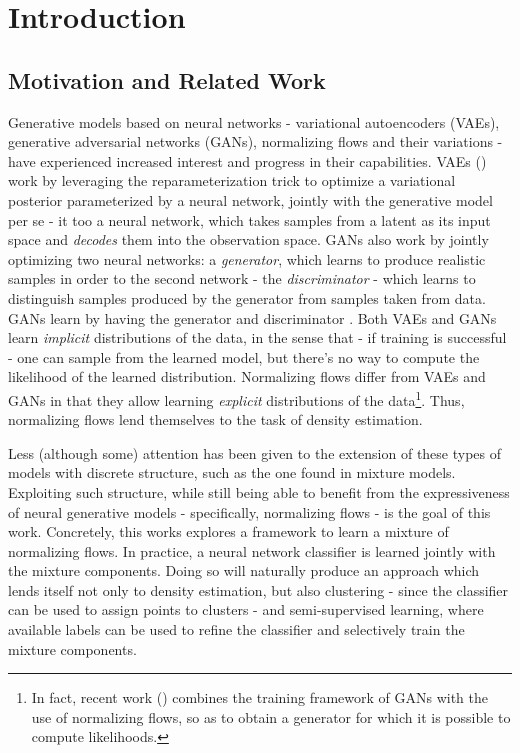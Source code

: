 \chapter{Introduction}
\label{chapter:introduction}

\section{Motivation and Related Work}
\label{section:motivation}

Generative models based on neural networks - variational autoencoders (VAEs),
generative adversarial networks (GANs), normalizing flows and their variations -
have experienced increased interest and progress in their capabilities. VAEs
(\autocite{vaepaper}) work by leveraging the reparameterization trick to optimize
a variational posterior parameterized by a neural network, jointly with the generative
model per se - it too a neural network, which takes samples from a latent as its
input space and \emph{decodes} them into the observation space. GANs also work by
jointly optimizing two neural networks: a \emph{generator}, which learns to produce
realistic samples in order to  the second network - the \emph{discriminator} - which
learns to distinguish samples produced by the generator from samples taken from data. GANs learn
by having the generator and discriminator . Both VAEs and GANs learn
\emph{implicit} distributions of the data, in the sense that - if training is
successful - one can sample from the learned model, but there's no way to compute
the likelihood of the learned distribution. Normalizing flows differ from VAEs
and GANs in that they allow learning \emph{explicit} distributions of the
data\footnote{In fact, recent work (\autocite{flowgan}) combines the training
framework of GANs with the use of normalizing flows, so as to obtain a generator
for which it is possible to compute likelihoods.}. Thus, normalizing flows lend
themselves to the task of density estimation.

Less (although some) attention has been given to the extension of these types
of models with discrete structure, such as the one found in mixture models.
Exploiting such structure, while still being able to benefit from the expressiveness
of neural generative models - specifically, normalizing flows - is the goal of this
work. Concretely, this works explores a framework to learn a mixture of normalizing
flows. In practice, a neural network classifier is learned jointly with the mixture
components. Doing so will naturally produce an approach which lends itself not
only to density estimation, but also clustering - since the classifier can be used
to assign points to clusters - and semi-supervised learning, where available
labels can be used to refine the classifier and selectively train the mixture
components.

